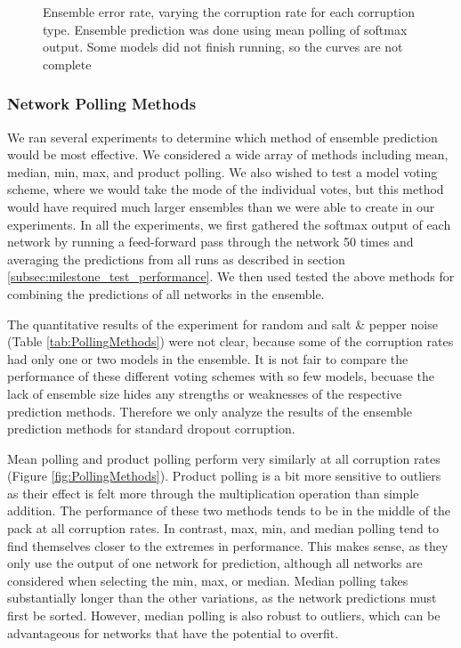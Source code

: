 \documentclass{article} %
\begin{document}
\begin{figure}[]
\begin{minipage}{.75\textwidth}
  \label{fig:ecr_sp}
\end{minipage}
\caption{Ensemble error rate, varying the corruption rate for each corruption type. Ensemble prediction was done using mean polling of softmax output. Some models did not finish running, so the curves are not complete}
\label{fig:ensemble_corruption_rate}
\end{figure}

\subsubsection{Network Polling Methods}
\label{subsec:polling}

We ran several experiments to determine which method of ensemble prediction would be most effective. We considered a wide array of methods including mean, median, min, max, and product polling. We also wished to test a model voting scheme, where we would take the mode of the individual votes, but this method would have required much larger ensembles than we were able to create in our experiments. In all the experiments, we first gathered the softmax output of each network by running a feed-forward pass through the network 50 times and averaging the predictions from all runs as described in section \ref{subsec:milestone_test_performance}. We then used tested the above methods for combining the predictions of all networks in the ensemble.

The quantitative results of the experiment for random and salt \& pepper noise (Table \ref{tab:PollingMethods}) were not clear, because some of the corruption rates had only one or two models in the ensemble. It is not fair to compare the performance of these different voting schemes with so few models, becuase the lack of ensemble size hides any strengths or weaknesses of the respective prediction methods. Therefore we only analyze the results of the ensemble prediction methods for standard dropout corruption.

Mean polling and product polling perform very similarly at all corruption rates (Figure \ref{fig:PollingMethods}). Product polling is a bit more sensitive to outliers as their effect is felt more through the multiplication operation than simple addition. The performance of these two methods tends to be in the middle of the pack at all corruption rates. In contrast, max, min, and median polling tend to find themselves closer to the extremes in performance. This makes sense, as they only use the output of one network for prediction, although all networks are considered when selecting the min, max, or median. Median polling takes substantially longer than the other variations, as the network predictions must first be sorted. However, median polling is also robust to outliers, which can be advantageous for networks that have the potential to overfit.
\end{document}
